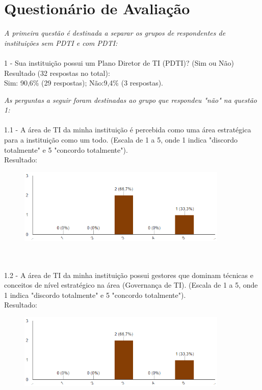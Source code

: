 \chapter{Questionário de Avaliação} %
\label{apendice:b_quest_avaliacao}
\textit{A primeira questão é destinada a separar os grupos de respondentes de instituições sem PDTI e com PDTI:}
\\
\\1 - Sua instituição possui um Plano Diretor de TI (PDTI)? (Sim ou Não)
\\Resultado (32 respostas no total): 
\\Sim: 90,6\% (29 respostas); Não:9,4\% (3 respostas).

\textit{As perguntas a seguir foram destinadas ao grupo que respondeu "não" na questão 1:}
\\
\\1.1 - A área de TI da minha instituição é percebida como uma área estratégica para a instituição como um todo. (Escala de 1 a 5, onde 1 indica "discordo totalmente" e 5 "concordo totalmente").
\\Resultado:
\begin{figure}[h]
\centering %
\includegraphics[width=10cm, frame]{figuras/apendiceB-1-2.png}
\end{figure}
\\
\\1.2 - A área de TI da minha instituição possui gestores que dominam técnicas e conceitos de nível estratégico na área (Governança de TI). (Escala de 1 a 5, onde 1 indica "discordo totalmente" e 5 "concordo totalmente").
\\Resultado:
\begin{figure}[h]
\centering %
\includegraphics[width=10cm, frame]{figuras/apendiceB-1-2.png}
\end{figure}


